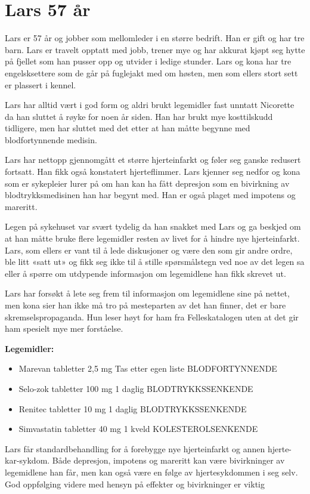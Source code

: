 \chapter{Lars 57 år} \label{chap:lars}

Lars er 57 år og jobber som mellomleder i en større bedrift. Han er gift og har tre barn. Lars er travelt opptatt med jobb, trener mye og har akkurat kjøpt seg hytte på fjellet som han pusser opp og utvider i ledige stunder. Lars og kona har tre engelsksettere som de går på fuglejakt med om høsten, men som ellers stort sett er plassert i kennel. 

Lars har alltid vært i god form og aldri brukt legemidler fast unntatt Nicorette da han sluttet å røyke for noen år siden. Han har brukt mye kosttilskudd tidligere, men har sluttet med det etter at han måtte begynne med blodfortynnende medisin.

Lars har nettopp gjennomgått et større hjerteinfarkt og føler seg ganske redusert fortsatt. Han fikk også konstatert hjerteflimmer. Lars kjenner seg nedfor og kona som er sykepleier lurer på om han kan ha fått depresjon som en bivirkning av blodtrykksmedisinen han har begynt med. Han er også plaget med impotens og mareritt.

Legen på sykehuset var svært tydelig da han snakket med Lars og ga beskjed om at han måtte bruke flere legemidler resten av livet for å hindre nye hjerteinfarkt. Lars, som ellers er vant til å lede diskusjoner og være den som gir andre ordre, ble litt «satt ut» og fikk seg ikke til å stille spørsmålstegn ved noe av det legen sa eller å spørre om utdypende informasjon om legemidlene han fikk skrevet ut.  

Lars har forsøkt å lete seg frem til informasjon om legemidlene sine på nettet, men kona sier han ikke må tro på mesteparten av det han finner, det er bare skremselspropaganda. Hun leser høyt for ham fra Felleskatalogen uten at det gir ham spesielt mye mer forståelse. 

\textbf{Legemidler:}
\begin{itemize}
\item Marevan tabletter 2,5 mg Tas etter egen liste BLODFORTYNNENDE
\item Selo-zok tabletter 100 mg 1 daglig BLODTRYKKSSENKENDE
\item Renitec tabletter 10 mg 1 daglig BLODTRYKKSSENKENDE
\item Simvastatin tabletter 40 mg 1 kveld KOLESTEROLSENKENDE
\end{itemize}

Lars får standardbehandling for å forebygge nye hjerteinfarkt og annen hjerte-kar-sykdom. Både depresjon, impotens og mareritt kan være bivirkninger av legemidlene han får, men kan også være en følge av hjertesykdommen i seg selv. God oppfølging videre med hensyn på effekter og bivirkninger er viktig
